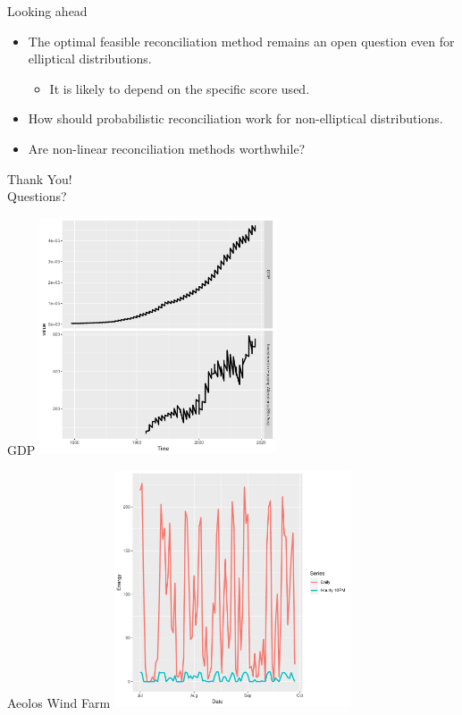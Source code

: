 \documentclass{beamer}
\begin{document}
   \begin{frame}{Looking ahead}\label{simdisc}
     \begin{itemize}
     	\item The optimal feasible reconciliation method remains an open question even for elliptical distributions.
     	\pause
     	\begin{itemize}
     		\item It is likely to depend on the specific score used.
     	\end{itemize}
        \pause
        \item How should probabilistic reconciliation work for non-elliptical distributions.
        \pause
        \item Are non-linear reconciliation methods worthwhile?
     \end{itemize}	
   \end{frame}
  \begin{frame}
    \Huge{Thank You!}\\
  \pause\Huge{Questions?}
  \end{frame}
  \begin{frame}{GDP}\label{GDP}
\centering
\includegraphics[height=7cm]{Figs/GDP}
\hfill\hyperlink{afterdat}{\beamerbutton{}}
\end{frame}
  \begin{frame}{Aeolos Wind Farm}\label{aelos}
  \centering
  \includegraphics[height=7cm]{Figs/Aeolos_Unscaled}
  \end{frame}
\end{document}
